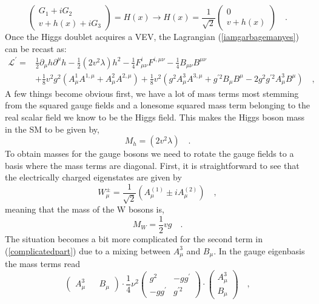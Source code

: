 \begin{equation}
 \begin{pmatrix}
G_1 + i G_2 \\ 
v + h(x) + i G_3 
\end{pmatrix} = H (x) \rightarrow H (x) =  \frac{1}{\sqrt{2}} \begin{pmatrix}
0 \\ 
v + h(x) 
\end{pmatrix} \quad .
\label{shame}
\end{equation}
Once the Higgs doublet acquires a VEV, the Lagrangian (\ref{iamgarbagemanyes}) can be recast as:
\begin{align}
\mathcal{L}^\prime = & \frac{1}{2} \partial_\mu h \partial^\mu h - \frac{1}{2} (2v^2 \lambda) h^2
 - \frac{1}{4} F^i_{\mu \nu} F^{i , \mu \nu} - \frac{1}{4} B_{\mu \nu} B^{\mu \nu}  \nonumber \\
& + \frac{1}{8} v^2 g^2 (A^1_\mu A^{1,\mu}+ A^2_\mu A^{2,\mu}) +  \frac{1}{8} v^2  (g^2  A^3_\mu A^{3,\mu} + g^{\prime 2} B_\mu B^\mu - 2 g^2 g^{\prime 2} A^3_\mu B^\mu ) \quad , 
\label{complicatedpart}
\end{align}
A few things become obvious first, we have a lot of mass terms most stemming from the squared gauge fields and a lonesome squared mass term belonging to the real scalar field we know to be the Higgs field. This makes the Higgs boson mass in the SM to be given by,
%
\begin{equation}
M_h= (2v^2 \lambda) \quad .  
\end{equation}
%
To obtain masses for the gauge bosons we need to rotate the gauge fields to a basis where the mass terms are diagonal. First, it is straightforward to see that the electrically charged eigenstates are given by %
\begin{equation}
W^\pm_\mu = \frac{1}{\sqrt{2}} (A^{(1)}_\mu \pm i A^{(2)}_\mu) \quad , 
\label{gagestate}
\end{equation}
meaning that the mass of the W bosons is, 
\begin{equation}
M_W= \frac{1}{2} v g \quad .
\end{equation}
The situation becomes a bit more complicated for the second term in (\ref{complicatedpart}) due to a mixing between $A_\mu^3$ and $B_\mu$. In the gauge eigenbasis the mass terms read
\begin{equation}
\begin{pmatrix}
A_\mu^3 && B_\mu
\end{pmatrix} \cdot  \frac{1}{4} \nu ^2 \begin{pmatrix}
g^2  & -g g^\prime \\
-g g^\prime & g^{\prime 2} 
\end{pmatrix} \cdot \begin{pmatrix}
A_\mu^3 \\  B_\mu
\end{pmatrix}  \quad , 
\end{equation} 
